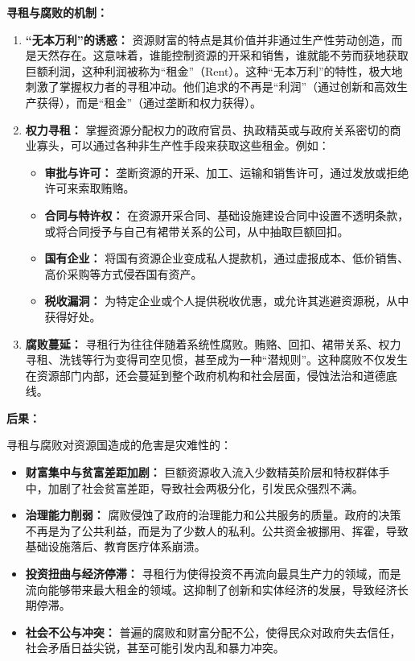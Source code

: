 \textbf{寻租与腐败的机制：}

\begin{enumerate}
    \item \textbf{“无本万利”的诱惑：} 资源财富的特点是其价值并非通过生产性劳动创造，而是天然存在。这意味着，谁能控制资源的开采和销售，谁就能不劳而获地获取巨额利润，这种利润被称为“租金”（Rent）。这种“无本万利”的特性，极大地刺激了掌握权力者的寻租冲动。他们追求的不再是“利润”（通过创新和高效生产获得），而是“租金”（通过垄断和权力获得）。
    \item \textbf{权力寻租：} 掌握资源分配权力的政府官员、执政精英或与政府关系密切的商业寡头，可以通过各种非生产性手段来获取这些租金。例如：
    \begin{itemize}
        \item \textbf{审批与许可：} 垄断资源的开采、加工、运输和销售许可，通过发放或拒绝许可来索取贿赂。
        \item \textbf{合同与特许权：} 在资源开采合同、基础设施建设合同中设置不透明条款，或将合同授予与自己有裙带关系的公司，从中抽取巨额回扣。
        \item \textbf{国有企业：} 将国有资源企业变成私人提款机，通过虚报成本、低价销售、高价采购等方式侵吞国有资产。
        \item \textbf{税收漏洞：} 为特定企业或个人提供税收优惠，或允许其逃避资源税，从中获得好处。
    \end{itemize}
    \item \textbf{腐败蔓延：} 寻租行为往往伴随着系统性腐败。贿赂、回扣、裙带关系、权力寻租、洗钱等行为变得司空见惯，甚至成为一种“潜规则”。这种腐败不仅发生在资源部门内部，还会蔓延到整个政府机构和社会层面，侵蚀法治和道德底线。
\end{enumerate}

\textbf{后果：}

寻租与腐败对资源国造成的危害是灾难性的：

\begin{itemize}
    \item \textbf{财富集中与贫富差距加剧：} 巨额资源收入流入少数精英阶层和特权群体手中，加剧了社会贫富差距，导致社会两极分化，引发民众强烈不满。
    \item \textbf{治理能力削弱：} 腐败侵蚀了政府的治理能力和公共服务的质量。政府的决策不再是为了公共利益，而是为了少数人的私利。公共资金被挪用、挥霍，导致基础设施落后、教育医疗体系崩溃。
    \item \textbf{投资扭曲与经济停滞：} 寻租行为使得投资不再流向最具生产力的领域，而是流向能够带来最大租金的领域。这抑制了创新和实体经济的发展，导致经济长期停滞。
    \item \textbf{社会不公与冲突：} 普遍的腐败和财富分配不公，使得民众对政府失去信任，社会矛盾日益尖锐，甚至可能引发内乱和暴力冲突。
\end{itemize}

